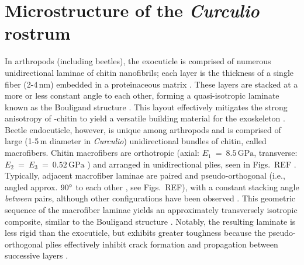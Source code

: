 \documentclass[twocolumn, linenumbers, superscriptaddress, nofootinbib]{revtex4-1}
\begin{document}
	\section{Microstructure of the \textit{Curculio} rostrum}
		In arthropods (including beetles), the exocuticle is comprised of numerous unidirectional laminae of chitin nanofibrils; each layer is the thickness of a single fiber (2-4\,nm) embedded in a proteinaceous matrix \cite{Nikolov2010, Nikolov2011}.
		These layers are stacked at a more or less constant angle to each other, forming a quasi-isotropic laminate known as the Bouligand structure \cite{Blackwell1980, Bouligand1972, Neville1976}. 
		This layout effectively mitigates the strong anisotropy of \textalpha-chitin to yield a versatile building material for the exoskeleton \cite{Vincent1982, Vincent2004, Nikolov2010, Nikolov2011}.		
		Beetle endocuticle, however, is unique among arthropods and is comprised of large (1-5\,{\textmu}m diameter in \textit{Curculio}) unidirectional bundles of chitin, called macrofibers.
		Chitin macrofibers are orthotropic (axial: $E_1~=~8.5\,\text{GPa}$, transverse: $ E_2~=~E_3~=~0.52\,\text{GPa}$ \cite{Jansen2016}) and arranged in unidirectional plies, seen in Figs.~REF \cite{Kamp2010, Kamp2015}.
		Typically, adjacent macrofiber laminae are paired and pseudo-orthogonal (i.e., angled approx. $90\degree$ to each other \cite{Cheng2009}, see Figs.~REF), with a constant stacking angle \emph{between} pairs, although other configurations have been observed \cite{Hepburn1973, Kamp2010, Kamp2015, Leopold1992}.
		This geometric sequence of the macrofiber laminae yields an approximately transversely isotropic composite, similar to the Bouligand structure \cite{Kamp2015, Nikolov2010}.
		Notably, the resulting laminate is less rigid than the exocuticle, but exhibits greater toughness because the pseudo-orthogonal plies effectively inhibit crack formation and propagation between successive layers \cite{Kamp2010, Kamp2015, Hepburn1973}.
		
\end{document}
